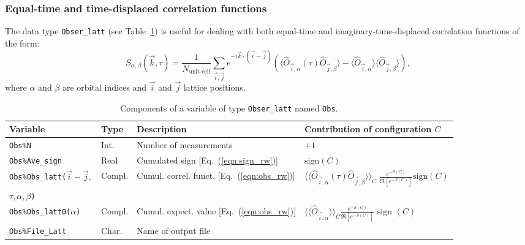 \subsubsection{ Equal-time and time-displaced correlation functions}

The data type \texttt{Obser\_latt} (see Table~\ref{table:Obser_latt}) is useful for dealing with both equal-time and imaginary-time-displaced correlation functions of the form: 
\begin{equation}\label{eqn:s}
	S_{\alpha,\beta}(\vec{k},\tau) =   \frac{1}{N_{\text{unit-cell}}} \sum_{\vec{i},\vec{j}}  e^{-i \vec{k} \cdot \left( \vec{i}-\vec{j}\right) } \left( \langle \hat{O}_{\vec{i},\alpha} (\tau) \hat{O}_{\vec{j},\beta} \rangle  - 
	  \langle \hat{O}_{\vec{i},\alpha} \rangle \langle   \hat{O}_{\vec{j},\beta}  \rangle \right),
\end{equation}
where $\alpha$ and $\beta$ are orbital indices and $\vec{i}$ and $\vec{j}$ lattice positions.
%
\begin{table}[h]
	\begin{tabular}{@{} l l l l @{}}\toprule
		Variable  &  Type      &  Description &  Contribution of configuration $C$ \\\midrule
		\texttt{Obs\%N}                       &  Int.        &   Number of measurements &    $+1$\\
		\texttt{Obs\%Ave\_sign}  
		&  Real  &    Cumulated sign [Eq.~(\ref{eqn:sign_rw})] & $\text{sign}(C)$  \\
		\texttt{Obs\%Obs\_latt($\vec{i}-\vec{j},$}        & Compl.      &    Cumul.  correl. funct. [Eq.~(\ref{eqn:obs_rw})] &  $ \langle \langle \hat{O}_{\vec{i},\alpha} (\tau) \hat{O}_{\vec{j},\beta} \rangle \rangle_{C} \; \frac{e^{-S(C)}} {\Re \left[e^{-S(C)} \right]}  \text{sign}(C) $ \vspace{-4pt} \\
		\hfill \texttt{$\tau,\alpha,\beta$)} & & & \\
		\texttt{Obs\%Obs\_latt0($\alpha$)}        & Compl.      &    Cumul. expect. value [Eq.~(\ref{eqn:obs_rw})] &   $ \langle \langle \hat{O}_{\vec{i},\alpha} \rangle \rangle_{C}\frac{e^{-S(C)}} {\Re \left[e^{-S(C)} \right]}  \text{ sign }(C) $ \\
		\texttt{Obs\%File\_Latt}           &  Char.    &    Name of output file  &\\\bottomrule
	\end{tabular}
	\caption{Components of a variable of type \texttt{Obser\_latt} named \texttt{Obs}.}
	\label{table:Obser_latt}
\end{table}
